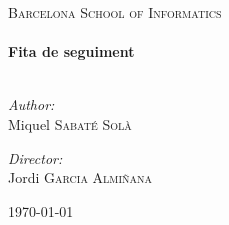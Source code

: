 %
%
%



\begin{titlepage}
\begin{center}

\textsc{\Large Barcelona School of Informatics}\\[0.5cm]

{ \small \HRule \\[0.4cm] }
{ \huge \bf Fita de seguiment \\[0.4cm] }
{ \small \HRule \\[0.4cm] }

\begin{minipage}{0.4\textwidth}
\begin{flushleft} \large
\emph{Author:}\\
Miquel \textsc{Sabaté Solà}
\end{flushleft}
\end{minipage}
\begin{minipage}{0.4\textwidth}
\begin{flushright} \large
\emph{Director:} \\
Jordi \textsc{Garcia Almiñana}
\end{flushright}
\end{minipage}

\vfill

{\large \today}

\end{center}
\end{titlepage}
